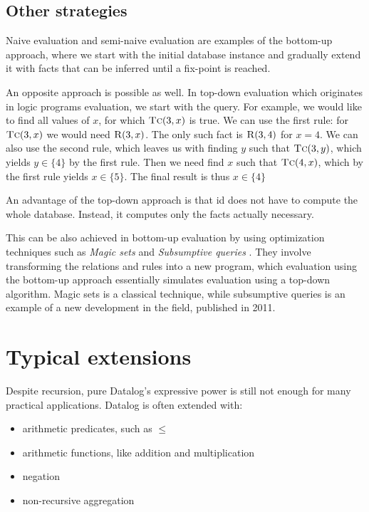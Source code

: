 \documentclass{pracamgr}
\theoremstyle{plain}
\theoremstyle{definition}
\theoremstyle{remark}
\newcommand{\relat}[2]{$\textsc{#1}#2$}
\begin{document}
\subsection{Other strategies}
Naive evaluation and semi-naive evaluation are examples of the bottom-up approach, where we start with the initial database instance and gradually extend it with facts that can be inferred until a fix-point is reached.

An opposite approach is possible as well. In top-down evaluation which originates in logic programs evaluation, we start with the query. For example, we would like to find all values of $x$, for which \relat{Tc}{(3, x)} is true. We can use the first rule: for \relat{Tc}{(3, x)} we would need \relat{R}{(3, x)}. The only such fact is \relat{R}{(3, 4)} for $x=4$. We can also use the second rule, which leaves us with finding $y$ such that \relat{Tc}{(3, y)}, which yields $y \in \{4\}$ by the first rule. Then we need find $x$ such that \relat{Tc}{(4, x)}, which by the first rule yields $x \in \{5\}$. The final result is thus $x \in \{4\}$

An advantage of the top-down approach is that id does not have to compute the whole database. Instead, it computes only the facts actually necessary.

This can be also achieved in bottom-up evaluation by using optimization techniques such as \emph{Magic sets} \cite{magicsets, fod} and \emph{Subsumptive queries} \cite{subsumptivequeries}. They involve transforming the relations and rules into a new program, which evaluation using the bottom-up approach essentially simulates evaluation using a top-down algorithm. Magic sets is a classical technique, while subsumptive queries is an example of a new development in the field, published in 2011.

\section{Typical extensions}
Despite recursion, pure Datalog's expressive power is still not enough for many practical applications. Datalog is often extended with:
\begin{itemize}
\item arithmetic predicates, such as $\le$
\item arithmetic functions, like addition and multiplication
\item negation
\item non-recursive aggregation
\end{itemize}
\end{document}
